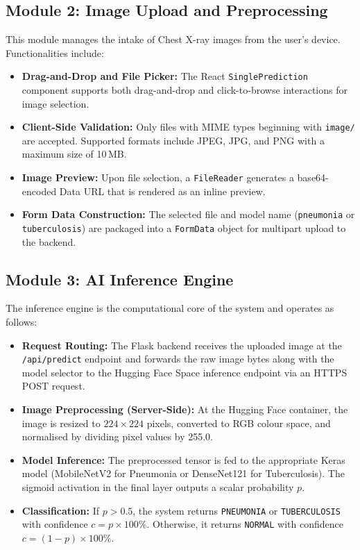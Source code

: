 \documentclass[12pt, a4paper, oneside]{report}
\begin{document}
\subsection{Module 2: Image Upload and Preprocessing}
\label{subsec:mod_upload}

This module manages the intake of Chest X-ray images from the user's device. Functionalities include:

\begin{itemize}
    \item \textbf{Drag-and-Drop and File Picker:} The React \texttt{SinglePrediction} component supports both drag-and-drop and click-to-browse interactions for image selection.
    \item \textbf{Client-Side Validation:} Only files with MIME types beginning with \texttt{image/} are accepted. Supported formats include JPEG, JPG, and PNG with a maximum size of 10\,MB.
    \item \textbf{Image Preview:} Upon file selection, a \texttt{FileReader} generates a base64-encoded Data URL that is rendered as an inline preview.
    \item \textbf{Form Data Construction:} The selected file and model name (\texttt{pneumonia} or \texttt{tuberculosis}) are packaged into a \texttt{FormData} object for multipart upload to the backend.
\end{itemize}

\subsection{Module 3: AI Inference Engine}
\label{subsec:mod_inference}

The inference engine is the computational core of the system and operates as follows:

\begin{itemize}
    \item \textbf{Request Routing:} The Flask backend receives the uploaded image at the \texttt{/api/predict} endpoint and forwards the raw image bytes along with the model selector to the Hugging Face Space inference endpoint via an HTTPS POST request.
    \item \textbf{Image Preprocessing (Server-Side):} At the Hugging Face container, the image is resized to $224 \times 224$ pixels, converted to RGB colour space, and normalised by dividing pixel values by 255.0.
    \item \textbf{Model Inference:} The preprocessed tensor is fed to the appropriate Keras model (MobileNetV2 for Pneumonia or DenseNet121 for Tuberculosis). The sigmoid activation in the final layer outputs a scalar probability $p$.
    \item \textbf{Classification:} If $p > 0.5$, the system returns \texttt{PNEUMONIA} or \texttt{TUBERCULOSIS} with confidence $c = p \times 100\%$. Otherwise, it returns \texttt{NORMAL} with confidence $c = (1 - p) \times 100\%$.
\end{itemize}
\end{document}
